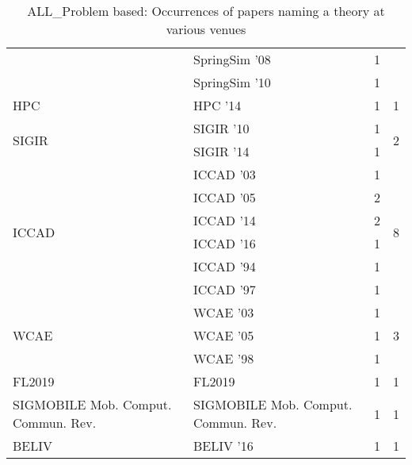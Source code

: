 \begin{table*}[t]
\begin{tabular}{llrr}
& SpringSim '08 & 1 &\\
& SpringSim '10 & 1 &\\
\multirow{1}{*}{HPC } & HPC '14 & 1 & \multirow{1}{*}{1}\\
\multirow{2}{*}{SIGIR } & SIGIR '10 & 1 & \multirow{2}{*}{2}\\
& SIGIR '14 & 1 &\\
\multirow{6}{*}{ICCAD } & ICCAD '03 & 1 & \multirow{6}{*}{8}\\
& ICCAD '05 & 2 &\\
& ICCAD '14 & 2 &\\
& ICCAD '16 & 1 &\\
& ICCAD '94 & 1 &\\
& ICCAD '97 & 1 &\\
\multirow{3}{*}{WCAE } & WCAE '03 & 1 & \multirow{3}{*}{3}\\
& WCAE '05 & 1 &\\
& WCAE '98 & 1 &\\
\multirow{1}{*}{FL2019} & FL2019 & 1 & \multirow{1}{*}{1}\\
\multirow{1}{*}{SIGMOBILE Mob. Comput. Commun. Rev.} & SIGMOBILE Mob. Comput. Commun. Rev. & 1 & \multirow{1}{*}{1}\\
\multirow{1}{*}{BELIV } & BELIV '16 & 1 & \multirow{1}{*}{1}\\
\end{tabular}
\caption{ALL\_Problem based: Occurrences of papers naming a theory at various venues}
\end{table*}